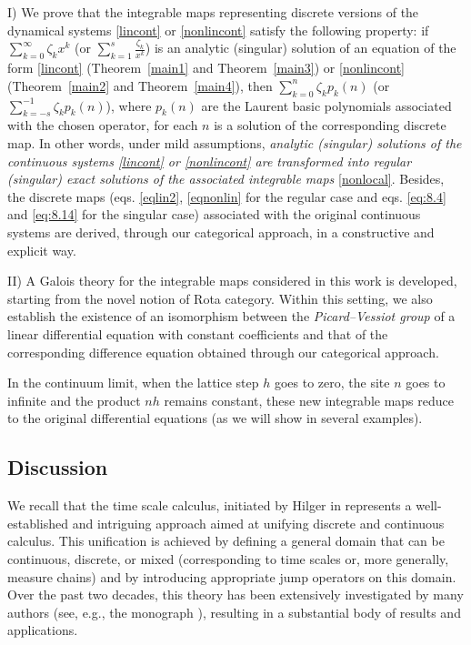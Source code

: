 \documentclass[10pt]{amsart}
\numberwithin{equation}{section}
\theoremstyle{definition}
\begin{document}
I) We prove that the integrable maps representing discrete versions of
the dynamical systems \eqref{lincont} or \eqref{nonlincont} satisfy the
following property: if $\sum _{k=0}^{\infty} \zeta _{k} x^{k}$ (or
$ \sum _{k=1}^{s}\frac{\zeta _{k}}{x^{k}}$) is an analytic (singular) solution
of an equation of the form \eqref{lincont} (Theorem~\ref{main1} and Theorem~\ref{main3}) or \eqref{nonlincont} (Theorem~\ref{main2} and Theorem~\ref{main4}), then $\sum _{k=0}^{n} \zeta _{k} p_{k}(n)$ (or
$\sum _{k=-s}^{-1} \zeta _{k} p_{k}(n)$), where $p_{k}(n)$ are the Laurent
basic polynomials associated with the chosen  operator, for each
$n$ is a solution of the corresponding discrete map. In other words, under
mild assumptions,
\textit{analytic (singular) solutions of the continuous systems \eqref{lincont} or \eqref{nonlincont} are transformed into regular (singular)
exact solutions of the associated integrable maps} \eqref{nonlocal}. Besides,
the discrete maps (eqs. \eqref{eqlin2}, \eqref{eqnonlin} for the regular
case and eqs. \eqref{eq:8.4} and \eqref{eq:8.14} for the singular case)
associated with the original continuous systems are derived, through our
categorical approach, in a constructive and explicit way.

\medskip
II) A Galois theory for the integrable maps considered in this work is
developed, starting from the novel notion of Rota category. Within this
setting, we also establish the existence of an isomorphism between the
\textit{Picard--Vessiot group} of a linear differential equation with constant
coefficients and that of the corresponding difference equation obtained
through our categorical approach.

\medskip

In the continuum limit, when the lattice step $h$ goes to zero, the site
$n$ goes to infinite and the product $nh$ remains constant, these new integrable
maps reduce to the original differential equations (as we will show in
several examples).

\subsection{Discussion}
\label{sec1.6}

We recall that the time scale calculus, initiated by Hilger in
\cite{Hilger1990} represents a well-established and intriguing approach
aimed at unifying discrete and continuous calculus. This unification is
achieved by defining a general domain that can be continuous, discrete,
or mixed (corresponding to time scales or, more generally, measure chains)
and by introducing appropriate jump operators on this domain. Over the
past two decades, this theory has been extensively investigated by many
authors (see, e.g., the monograph \cite{BG2017}), resulting in a substantial
body of results and applications.
\end{document}
